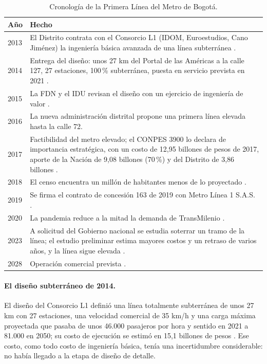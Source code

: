 \begin{table}[ht]
\centering\small
\caption{Cronología de la Primera Línea del Metro de Bogotá.}\label{tab:cronologia}
\begin{tabular}{lp{11.8cm}}
\toprule
Año & Hecho \\
\midrule
2013 & El Distrito contrata con el Consorcio L1 (IDOM, Euroestudios, Cano Jiménez) la ingeniería básica avanzada de una línea subterránea \citep{alcaldia2014metro}. \\
2014 & Entrega del diseño: unos 27 km del Portal de las Américas a la calle 127, 27 estaciones, 100\,\% subterránea, puesta en servicio prevista en 2021 \citep{alcaldia2014metro,fdn2015}. \\
2015 & La FDN y el IDU revisan el diseño con un ejercicio de ingeniería de valor \citep{fdn2015}. \\
2016 & La nueva administración distrital propone una primera línea elevada hasta la calle 72. \\
2017 & Factibilidad del metro elevado; el CONPES 3900 lo declara de importancia estratégica, con un costo de 12,95 billones de pesos de 2017, aporte de la Nación de 9,08 billones (70\,\%) y del Distrito de 3,86 billones \citep{conpes3900,alcaldia2017conpes}. \\
2018 & El censo encuentra un millón de habitantes menos de lo proyectado \citep{dane2019censo}. \\
2019 & Se firma el contrato de concesión 163 de 2019 con Metro Línea 1 S.A.S. \citep{emb2023}. \\
2020 & La pandemia reduce a la mitad la demanda de TransMilenio \citep{silla2026}. \\
2023 & A solicitud del Gobierno nacional se estudia soterrar un tramo de la línea; el estudio preliminar estima mayores costos y un retraso de varios años, y la línea sigue elevada \citep{emb2023,eltiempo2023,narvaez2023}. \\
2028 & Operación comercial prevista \citep{emb2026}. \\
\bottomrule
\end{tabular}
\end{table}

\paragraph{El diseño subterráneo de 2014.} El diseño del Consorcio L1 definió una línea totalmente
subterránea de unos 27 km con 27 estaciones, una velocidad comercial de 35 km/h y una carga máxima
proyectada que pasaba de unos 46.000 pasajeros por hora y sentido en 2021 a 81.000 en 2050; su costo
de ejecución se estimó en 15,1 billones de pesos \citep{fdn2015}. Ese costo, como todo costo de
ingeniería básica, tenía una incertidumbre considerable: no había llegado a la etapa de diseño de
detalle.

